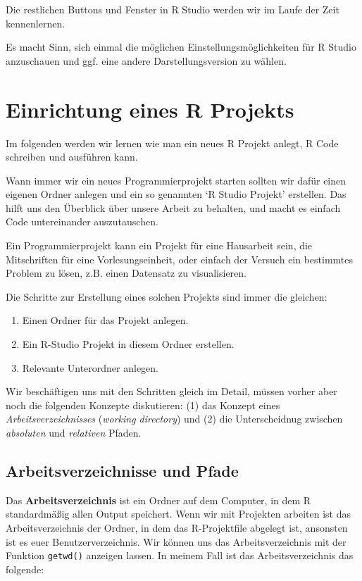 \documentclass[]{tufte-book}
\providecommand{\tightlist}{%
  \setlength{\itemsep}{0pt}\setlength{\parskip}{0pt}}
\begin{document}
Die restlichen Buttons und Fenster in R Studio werden wir im Laufe der
Zeit kennenlernen.

Es macht Sinn, sich einmal die möglichen Einstellungsmöglichkeiten für R
Studio anzuschauen und ggf. eine andere Darstellungsversion zu wählen.

\section{Einrichtung eines R
Projekts}\label{einrichtung-eines-r-projekts}

Im folgenden werden wir lernen wie man ein neues R Projekt anlegt, R
Code schreiben und ausführen kann.

Wann immer wir ein neues Programmierprojekt starten sollten wir dafür
einen eigenen Ordner anlegen und ein so genannten `R Studio Projekt'
erstellen. Das hilft uns den Überblick über unsere Arbeit zu behalten,
und macht es einfach Code untereinander auszutauschen.

Ein Programmierprojekt kann ein Projekt für eine Hausarbeit sein, die
Mitschriften für eine Vorlesungseinheit, oder einfach der Versuch ein
bestimmtes Problem zu lösen, z.B. einen Datensatz zu visualisieren.

Die Schritte zur Erstellung eines solchen Projekts sind immer die
gleichen:

\begin{enumerate}
\def\labelenumi{\arabic{enumi}.}
\tightlist
\item
  Einen Ordner für das Projekt anlegen.
\item
  Ein R-Studio Projekt in diesem Ordner erstellen.
\item
  Relevante Unterordner anlegen.
\end{enumerate}

Wir beschäftigen uns mit den Schritten gleich im Detail, müssen vorher
aber noch die folgenden Konzepte diskutieren: (1) das Konzept eines
\emph{Arbeitsverzeichnisses} (\emph{working directory}) und (2) die
Unterscheidnug zwischen \emph{absoluten} und \emph{relativen} Pfaden.

\subsection{Arbeitsverzeichnisse und
Pfade}\label{arbeitsverzeichnisse-und-pfade}

Das \textbf{Arbeitsverzeichnis} ist ein Ordner auf dem Computer, in dem
R standardmäßig allen Output speichert. Wenn wir mit Projekten arbeiten
ist das Arbeitsverzeichnis der Ordner, in dem das R-Projektfile abgelegt
ist, ansonsten ist es euer Benutzerverzeichnis. Wir können uns das
Arbeitsverzeichnis mit der Funktion \texttt{getwd()} anzeigen lassen. In
meinem Fall ist das Arbeitsverzeichnis das folgende:
\end{document}
